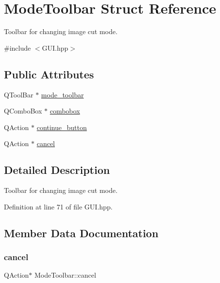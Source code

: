 \hypertarget{structModeToolbar}{}\section{Mode\+Toolbar Struct Reference}
\label{structModeToolbar}


Toolbar for changing image cut mode.  




{\ttfamily \#include $<$G\+U\+I.\+hpp$>$}

\subsection*{Public Attributes}
\begin{DoxyCompactItemize}
\item 
Q\+Tool\+Bar $\ast$ \mbox{\hyperlink{structModeToolbar_acc6bcdd91825343f34ec38d312418234}{mode\+\_\+toolbar}}
\item 
Q\+Combo\+Box $\ast$ \mbox{\hyperlink{structModeToolbar_ad0ba4f03ef2a44e2543add404a50b4f1}{combobox}}
\item 
Q\+Action $\ast$ \mbox{\hyperlink{structModeToolbar_af7d7766f5b1710abb382c42689e963ca}{continue\+\_\+button}}
\item 
Q\+Action $\ast$ \mbox{\hyperlink{structModeToolbar_a814fa4aec4ff40543904dfc4aa4c8e89}{cancel}}
\end{DoxyCompactItemize}


\subsection{Detailed Description}
Toolbar for changing image cut mode. 

Definition at line 71 of file G\+U\+I.\+hpp.



\subsection{Member Data Documentation}
\mbox{\label{structModeToolbar_a814fa4aec4ff40543904dfc4aa4c8e89}} 
\subsubsection{\texorpdfstring{cancel}{cancel}}
{\footnotesize\ttfamily Q\+Action$\ast$ Mode\+Toolbar\+::cancel}


